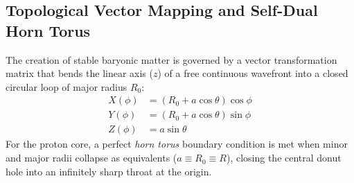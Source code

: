 \documentclass[11pt,a4paper]{article}
\begin{document}
	\subsection{Topological Vector Mapping and Self-Dual Horn Torus}
	The creation of stable baryonic matter is governed by a vector transformation matrix that bends the linear axis ($z$) of a free continuous wavefront into a closed circular loop of major radius $R_0$:
	\begin{align}
		X(\phi) &= (R_0 + a \cos\theta) \cos\phi \\
		Y(\phi) &= (R_0 + a \cos\theta) \sin\phi \\
		Z(\phi) &= a \sin\theta
	\end{align}
	For the proton core, a perfect \textit{horn torus} boundary condition is met when minor and major radii collapse as equivalents ($a \equiv R_0 \equiv R$), closing the central donut hole into an infinitely sharp throat at the origin.
	
\end{document}
